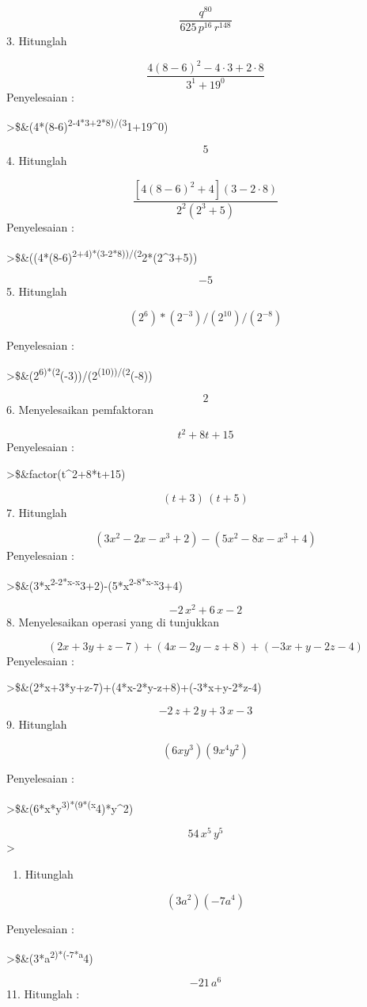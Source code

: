 \documentclass[
]{book}
\providecommand{\tightlist}{%
  \setlength{\itemsep}{0pt}\setlength{\parskip}{0pt}}
\begin{document}
\[\frac{q^{80}}{625\,p^{16}\,r^{148}}\]3. Hitunglah

\[\frac {4(8-6)^2-4\cdot3+2\cdot8}{3^1+19^0}\]Penyelesaian :

\textgreater\$\&(4*(8-6)\textsuperscript{2-4*3+2*8)/(3}1+19\^{}0)

\[5\]4. Hitunglah

\[\frac{[4(8-6)^2+4](3-2\cdot8)}{2^2(2^3+5)}\]Penyelesaian :

\textgreater\$\&((4*(8-6)\textsuperscript{2+4)*(3-2*8))/(2}2*(2\^{}3+5))

\[-5\]5. Hitunglah

\[(2^6)*(2^{-3})/(2^{10})/(2^{-8})\]

Penyelesaian :

\textgreater\$\&(2\textsuperscript{6)*(2}(-3))/(2\textsuperscript{(10))/(2}(-8))

\[2\]6. Menyelesaikan pemfaktoran

\[t^2+8t+15\]Penyelesaian :

\textgreater\$\&factor(t\^{}2+8*t+15)

\[\left(t+3\right)\,\left(t+5\right)\]7. Hitunglah

\[{(3x^{2}-2x-x^{3}+2)}-{(5x^{2}-8x-x^{3}+4)}\]Penyelesaian :

\textgreater\$\&(3*x\textsuperscript{2-2*x-x}3+2)-(5*x\textsuperscript{2-8*x-x}3+4)

\[-2\,x^2+6\,x-2\]8. Menyelesaikan operasi yang di tunjukkan

\[(2x+3y+z-7)+(4x-2y-z+8)+(-3x+y-2z-4)\]Penyelesaian :

\textgreater\$\&(2*x+3*y+z-7)+(4*x-2*y-z+8)+(-3*x+y-2*z-4)

\[-2\,z+2\,y+3\,x-3\]9. Hitunglah

\[(6xy^3)(9x^4y^2)\]

Penyelesaian :

\textgreater\$\&(6*x*y\textsuperscript{3)*(9*(x}4)*y\^{}2)

\[54\,x^5\,y^5\]\textgreater{}

\begin{enumerate}
\def\labelenumi{\arabic{enumi}.}
\setcounter{enumi}{9}
\tightlist
\item
  Hitunglah
\end{enumerate}

\[(3a^2)(-7a^4)\]

Penyelesaian :

\textgreater\$\&(3*a\textsuperscript{2)*(-7*a}4)

\[-21\,a^6\]11. Hitunglah :
\end{document}
